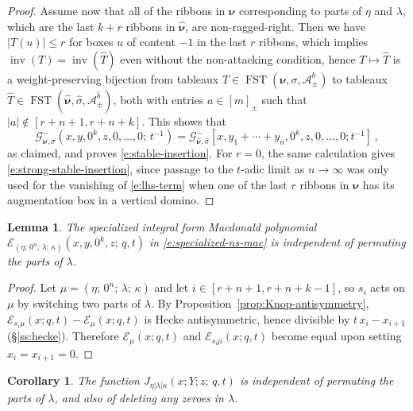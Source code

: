 \documentclass[12pt]{amsart}
\newtheorem{lemma}[thm]{Lemma}
\newtheorem{cor}[thm]{Corollary}
\theoremstyle{definition}
\theoremstyle{remark}
\newcommand{\nubold}{{\boldsymbol \nu }}
\newcommand{\Acal}{{\mathcal A}}
\newcommand{\Ecal}{{\mathcal E}}
\newcommand{\Gcal}{{\mathcal G}}
\newcommand{\That}{\widehat{T}}
\newcommand{\bhat}{\widehat{b}}
\newcommand{\sigmahat}{\widehat{\sigma }}
\newcommand{\nuboldhat}{\widehat{\nubold }}
\DeclareMathOperator{\inv}{inv}
\DeclareMathOperator{\FSST}{FST}
\newcommand{\Jns}{J}           %
\begin{document}
\begin{proof}
Assume now that all of the ribbons in $\nubold $ corresponding to
parts of $\eta $ and $\lambda $, which are the last $k+r$ ribbons in
$\nuboldhat $, are non-ragged-right.  Then we have $|T(u)|\leq r$ for
boxes $u$ of content $-1$ in the last $r$ ribbons, which implies $\inv
(T) = \inv (\That )$ even without the non-attacking condition, hence
$T\mapsto \That $ is a weight-preserving bijection from tableaux $T\in
\FSST (\nubold ,\sigma ,\Acal _{\pm }^{b})$ to tableaux $\That \in
\FSST (\nuboldhat ,\sigmahat ,\Acal _{\pm }^{\bhat })$, both with
entries $a\in [m]_{\pm }$ such that $|a|\not \in [r+n+1, r+n+k]$.
This shows that
\begin{equation}\label{e:horizontal-term}
\Gcal _{\nubold ,\sigma }^{-}(x, y, 0^{k}, z, 0,\ldots,0;\, t^{-1}) =
\Gcal _{\nuboldhat ,\sigmahat }^{-}[x, y_{1}+\cdots +y_{n}, 0^{k}, z,
0,\ldots,0; t^{-1}]\, ,
\end{equation}
as claimed, and proves \eqref{e:stable-insertion}.  For $r=0$, the
same calculation gives \eqref{e:strong-stable-insertion}, since
passage to the $t$-adic limit as $n\rightarrow \infty $ was only used
for the vanishing of \eqref{e:lhs-term} when one of the last $r$
ribbons in $\nubold $ has its augmentation box in a vertical domino.
\end{proof}


\begin{lemma}\label{lem:lambda-independence}
The specialized integral form Macdonald polynomial $\Ecal _{(\eta ;\,
0^{n};\, \lambda ;\, \kappa )}(x,y,0^{k},z;\, q,t)$ in
\eqref{e:specialized-ns-mac} is independent of permuting the parts of
$\lambda $.
\end{lemma}

\begin{proof}
Let $\mu = (\eta ;\, 0^{n};\, \lambda ;\, \kappa )$ and let $i\in
[r+n+1,r+n+k-1]$, so $s_{i}$ acts on $\mu $ by switching two parts of
$\lambda $.  By Proposition~\ref{prop:Knop-antisymmetry}, $\Ecal
_{s_{i} \mu }(x;q,t) - \Ecal _{\mu }(x;q,t)$ is Hecke antisymmetric,
hence divisible by $t\, x_{i} - x_{i+1}$ (\S \ref{ss:hecke}).
Therefore $\Ecal _{\mu }(x;q,t)$ and $\Ecal _{s_{i} \mu }(x;q,t)$
become equal upon setting $x_{i}= x_{i+1} = 0$.
\end{proof}


\begin{cor}\label{cor:lambda-independence}
The function $\Jns _{\eta |\lambda |\kappa }(x;Y;z;\, q,t)$ is
independent of permuting the parts of $\lambda $, and also of deleting
any zeroes in $\lambda $.
\end{cor}
\end{document}
